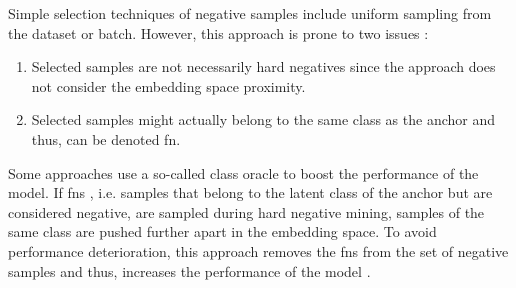Simple selection techniques of negative samples include uniform sampling from the dataset or batch.
However, this approach is prone to two issues \citet{robinson_contrastive_2021,mining_potential_2024}:
\begin{enumerate}
    \item Selected samples are not necessarily hard negatives since the approach does not consider the embedding space proximity.
    \item Selected samples might actually belong to the same class as the anchor and thus, can be denoted \ac{fn}.
\end{enumerate}

Some approaches use a so-called class oracle to boost the performance of the model.
If \acp{fn} \cite{grape_2024,curricular_weighting_2024,progcl_2022}, i.e. 
samples that belong to the latent class of the anchor but are considered negative, 
are sampled during hard negative mining, 
samples of the same class are pushed further apart in the embedding space. 
To avoid performance deterioration, this approach removes the \acp{fn} from the set of negative samples and thus, 
increases the performance of the model \citet{mochi_2020}.
